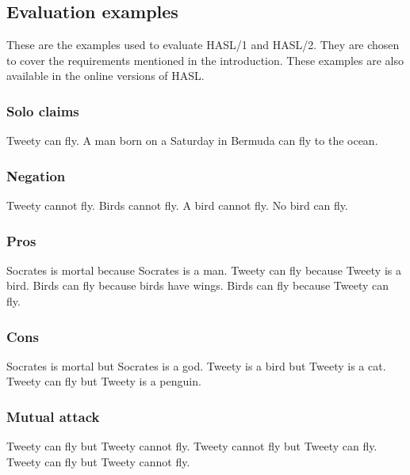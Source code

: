 \subsection{Evaluation examples}
These are the examples used to evaluate HASL/1 and HASL/2. They are chosen to cover the requirements mentioned in the introduction. These examples are also available in the online versions of HASL.

\subsubsection{Solo claims}
\begin{exe}
\ex\label{e1} Tweety can fly.
\ex\label{e2} A man born on a Saturday in Bermuda can fly to the ocean.
\end{exe}

\subsubsection{Negation}
\begin{exe}
\ex\label{e3} Tweety cannot fly.
\ex\label{e4} Birds cannot fly.
\ex\label{e5} A bird cannot fly.
\ex\label{e6} No bird can fly.
\end{exe}

\subsubsection{Pros}
\begin{exe}
\ex\label{e7} Socrates is mortal because Socrates is a man.
\ex\label{e8} Tweety can fly because Tweety is a bird.
\ex\label{e9} Birds can fly because birds have wings.
\ex\label{e70} Birds can fly because Tweety can fly.
\end{exe}

\subsubsection{Cons}
\begin{exe}
\ex\label{e10} Socrates is mortal but Socrates is a god.
\ex\label{e11} Tweety is a bird but Tweety is a cat.
\ex\label{e12} Tweety can fly but Tweety is a penguin.
\end{exe}

\subsubsection{Mutual attack}
\begin{exe}
\ex\label{e14} Tweety can fly but Tweety cannot fly. Tweety cannot fly but Tweety can fly.
\ex\label{e15} Tweety can fly but Tweety cannot fly.
\end{exe}

